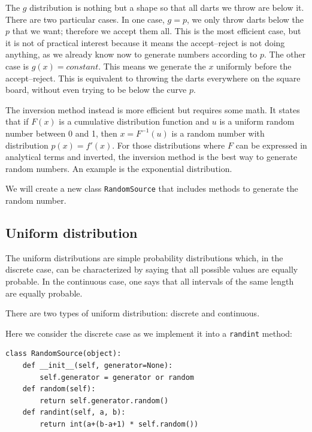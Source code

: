 \documentclass[justified, sixbynine]{tufte-book}
\def\ft{\small\tt}
\theoremstyle{plain}%
\newtheorem * {corollary}{Corollary}
\theoremstyle{definition}
\theoremstyle{remark}
\newtheorem * {remark}{Remark}
\newtheorem * {note}{Note}
\begin{document}
\begin{fullwidth}
The $g$ distribution is nothing but a shape so that all darts we throw are below it. There are two particular cases. In one case, $g=p$, we only throw darts below the $p$ that we want; therefore we accept them all. This is the most efficient case, but it is not of practical interest because it means the accept--reject is not doing anything, as we already know now to generate numbers according to $p$. The other case is $g(x) = constant$. This means we generate the $x$ uniformly before the accept--reject. This is equivalent to throwing the darts everywhere on the square board, without even trying to be below the curve $p$.

The inversion method instead is more efficient but requires some math. It states that if $F(x)$ is a cumulative distribution function and $u$ is a uniform random number between 0 and 1, then $x = F^{-1}(u)$ is a random number with distribution $p(x)=f'(x)$. For those distributions where $F$ can be expressed in analytical terms and inverted, the inversion method is the best way to generate random numbers. An example is the exponential distribution.

We will create a new class {\ft RandomSource} that includes methods to generate the random number.

\goodbreak\subsection{Uniform distribution}

The uniform distributions are simple probability distributions which, in the
discrete case, can be characterized by saying that all possible values are
equally probable. In the continuous case, one says that all intervals of the
same length are equally probable.

There are two types of uniform distribution: discrete and continuous.

Here we consider the discrete case as we implement it into a {\ft randint} method:


\begin{lstlisting}[caption={in file: {\ft nlib.py}}]
class RandomSource(object):
    def __init__(self, generator=None):
        self.generator = generator or random 
    def random(self):
        return self.generator.random()
    def randint(self, a, b):
        return int(a+(b-a+1) * self.random())
\end{lstlisting}


\end{fullwidth}
\end{document}
